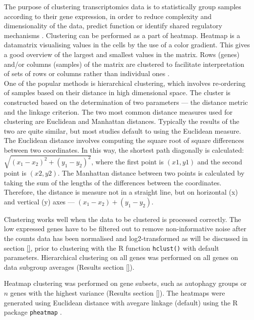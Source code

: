     The purpose of clustering transcriptomics data is to statistically group samples according to their gene expression, in order to reduce complexity and dimensionality of the data, predict function or identify shared regulatory mechanisms \cite{Metsalu2015ClustVis:Heatmap}. Clustering can be performed as a part of heatmap. Heatmap is a datamatrix visualising values in the cells by the use of a color gradient. This gives a good overview of the largest and smallest values in the matrix. Rows (genes) and/or columns (samples) of the matrix are clustered to facilitate interpretation of sets of rows or columns rather than individual ones \cite{Metsalu2015ClustVis:Heatmap}.\\

    One of the popular methods is hierarchical clustering, which involves re-ordering of samples based on their distance in high dimensional space. The cluster is constructed based on the determination of two parameters — the distance metric and the linkage criterion.
    The two most common distance measures used for clustering are Euclidean and Manhattan distances. Typically the results of the two are quite similar, but most studies default to using the Euclidean measure. 
    The Euclidean distance involves computing the square root of square differences between two coordinates. In this way, the shortest path diagonally is calculated: $ \sqrt{(x_{1}-x_{2})^{2}+(y_{1}-y_{2})^{2}}$, where the first point is $(x1, y1)$ and the second point is $(x2, y2).$
    The Manhattan distance between two points is calculated by taking the sum of the lengths of the differences between the coordinates. Therefore, the distance is measure not in a straight line, but on horizontal (x) and vertical (y) axes — $ (x_{1}-x_{2})+(y_{1}-y_{2}).$
    
    Clustering works well when the data to be clustered is processed correctly. The low expressed genes have to be filtered out to remove non-informative noise after the counts data has been normalised and log2-transformed as will be discussed in section \ref{}, prior to clustering with the R function \texttt{hclust()} with default parameters. Hierarchical clustering on all genes was performed on all genes on data subgroup averages (Results section \ref{}).
    
    Heatmap clustering was performed on gene subsets, such as autophagy groups or $n$ genes with the highest variance (Results section \ref{}). The heatmaps were generated using Euclidean distance with avegare linkage (default) using the R package  \texttt{pheatmap} \cite{kolde2012pheatmap}.\\
    
